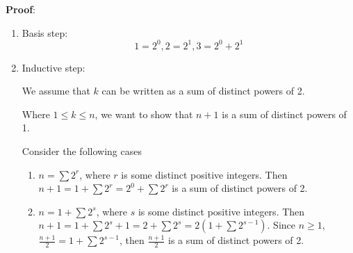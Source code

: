 \documentclass{article}
\begin{document}
\textbf{Proof}:
\begin{enumerate}
	\item Basis step:
	      \begin{equation*}
		      1 = 2^0, 2 = 2^1, 3 = 2^0 + 2^1
	      \end{equation*}
	\item Inductive step:

	      We assume that $ k $ can be written as a sum of distinct powers of 2.

	      Where $ 1 \leq k \leq n $, we want to show that $ n + 1 $ is a sum of distinct powers of 1.

	      Consider the following cases
	      \begin{enumerate}
		      \item $ n = \sum 2^r $, where $ r $ is some distinct positive integers. Then $ n + 1 = 1 + \sum 2^r = 2^0 + \sum 2^r $ is a sum of distinct powers of 2.

		      \item $ n = 1 + \sum 2^s $, where $ s $ is some distinct positive integers. Then $ n + 1 = 1 + \sum 2^s + 1 = 2 + \sum 2^s = 2 \left( 1 + \sum 2^{s - 1} \right) $. Since $ n \geq 1 $, $ \frac{ n + 1 }{ 2 } = 1 + \sum 2^{s - 1} $, then $ \frac{ n + 1 }{ 2 } $ is a sum of distinct powers of 2.
	      \end{enumerate}
\end{enumerate}
\end{document}
